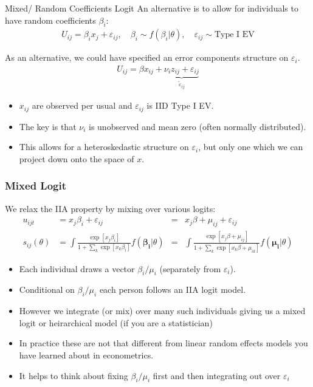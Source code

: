 \begin{frame}{Mixed/ Random Coefficients Logit}
An alternative is to allow for individuals to have \alert{random coefficients} $\beta_i$:
\begin{eqnarray*}
U_{ij} = \beta_i x_{j} +  \varepsilon_{ij}, \quad \beta_i \sim f( \beta_i | \theta),  \quad \varepsilon_{ij} \sim \text{Type I EV}
\end{eqnarray*}

As an alternative, we could have specified an error components structure on $\varepsilon_i$.
\begin{align*}
U_{ij} = \beta x_{ij} + \underbrace{\nu_i z_{ij} + \varepsilon_{ij}}_{\tilde{\varepsilon}_{ij}}
\end{align*}
\vspace{-0.8cm}
\begin{itemize}
\item $x_{ij}$ are observed per usual and $\varepsilon_{ij}$ is IID Type I EV.
\item The key is that $\nu_i$ is unobserved and mean zero (often normally distributed).
\item This allows for a heteroskedastic structure on $\varepsilon_{i}$, but only one which we can project down onto the space of $x$.
\end{itemize}

\end{frame}


\begin{frame}
\frametitle{Mixed Logit}
We relax the IIA property by mixing over various logits:
\begin{align*}
u_{ijt} &= x_j \beta_i + \varepsilon_{ij}  
&=&  x_j \beta  + \mu_{ij}+ \varepsilon_{ij}   \\
s_{ij}(\theta) &= \int \frac{\exp[x_{j} \beta_i ]}{1+\sum_k \exp[x_{k} \beta_i ]} f(\boldsymbol{\beta_i} | \theta) 
&=& \int \frac{\exp[x_{j} \beta + \mu_{ij} ]}{1+\sum_k \exp[x_{k} \beta+ \mu_{ik} ]} f(\boldsymbol{\mu_i} | \theta)
\end{align*}
 \begin{itemize}
 \item Each individual draws a vector $\beta_i/\mu_i$ (separately from $\varepsilon_i$).
 \item Conditional on $\beta_i/\mu_i$ each person follows an IIA logit model.
 \item However we integrate (or mix) over many such individuals giving us a \alert{mixed logit} or \alert{heirarchical model} (if you are a statistician)
 \item In practice these are not that different from linear \alert{random effects models} you have learned about in econometrics.
 \item It helps to think about fixing $\beta_i/\mu_i$ first and then integrating out over $\varepsilon_i$
 \end{itemize}
\end{frame}


